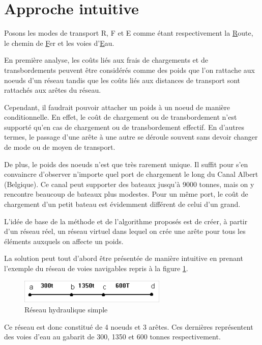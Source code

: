 \section{Approche intuitive}



Posons les modes de transport R, F et E comme étant respectivement
la
\underline{R}oute, le chemin de \underline{F}er et les voies d'\underline{E}au.


En première analyse, les coûts liés aux frais de chargements et de
transbordements peuvent être considérés comme des poids que l'on
rattache aux noeuds d'un réseau tandis que les coûts liés aux
distances de transport sont rattachés aux arêtes du réseau.

Cependant, il faudrait pouvoir attacher un poids à un noeud de manière
condi\-tion\-nelle. En effet, le coût de chargement ou de transbordement n'est
supporté qu'en cas de chargement ou de transbordement effectif. En d'autres
termes, le passage d'une arête à une autre se déroule souvent sans devoir
changer de mode ou de moyen de transport.

De plus, le poids des noeuds n'est que très rarement unique. Il
suffit pour s'en convaincre d'observer n'importe quel port de
chargement le long du Canal Albert (Belgique). Ce canal peut
supporter des bateaux jusqu'à 9000 tonnes, mais on y rencontre
beaucoup de bateaux plus modestes. Pour un même port, le coût de
chargement d'un petit bateau est évidemment différent de celui d'un
grand.

L'idée de base de la méthode et de l'algorithme proposés est de
créer, à partir d'un réseau réel, un réseau virtuel dans lequel on
crée une arête pour tous les éléments auxquels on affecte un poids.

La solution peut tout d'abord être présentée de manière intuitive en prenant
l'exemple du réseau de voies navigables repris à la figure \ref{f3_1}.

\begin{figure}[htbp]
\centerline{\includegraphics[width=7cm]{f3_1.png}}
\caption{\label{f3_1} R\'eseau hydraulique simple}
\end{figure}


Ce réseau est donc constitué de 4 noeuds et 3 arêtes. Ces dernières
représentent des voies d'eau au gabarit de 300, 1350 et 600 tonnes
respectivement.

